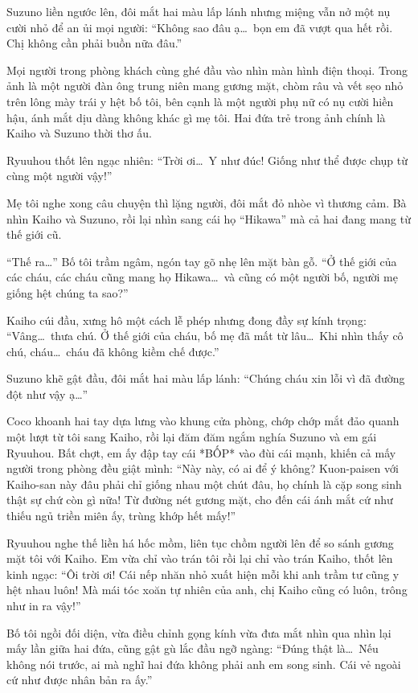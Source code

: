 ﻿\documentclass[../main.tex]{subfiles}
\begin{document}
Suzuno liền ngước lên, đôi mắt hai màu lấp lánh nhưng miệng vẫn nở một nụ cười nhỏ để an ủi mọi người: ``Không sao đâu ạ\dots\ bọn em đã vượt qua hết rồi. Chị không cần phải buồn nữa đâu.''

Mọi người trong phòng khách cùng ghé đầu vào nhìn màn hình điện thoại. Trong ảnh là một người đàn ông trung niên mang gương mặt, chòm râu và vết sẹo nhỏ trên lông mày trái y hệt bố tôi, bên cạnh là một người phụ nữ có nụ cười hiền hậu, ánh mắt dịu dàng không khác gì mẹ tôi. Hai đứa trẻ trong ảnh chính là Kaiho và Suzuno thời thơ ấu.

Ryuuhou thốt lên ngạc nhiên: ``Trời ơi\dots\ Y như đúc! Giống như thể được chụp từ cùng một người vậy!''

Mẹ tôi nghe xong câu chuyện thì lặng người, đôi mắt đỏ nhòe vì thương cảm. Bà nhìn Kaiho và Suzuno, rồi lại nhìn sang cái họ ``Hikawa'' mà cả hai đang mang từ thế giới cũ.

``Thế ra\dots'' Bố tôi trầm ngâm, ngón tay gõ nhẹ lên mặt bàn gỗ. ``Ở thế giới của các cháu, các cháu cũng mang họ Hikawa\dots\ và cũng có một người bố, người mẹ giống hệt chúng ta sao?''

Kaiho cúi đầu, xưng hô một cách lễ phép nhưng đong đầy sự kính trọng: ``Vâng\dots\ thưa chú. Ở thế giới của cháu, bố mẹ đã mất từ lâu\dots\ Khi nhìn thấy cô chú, cháu\dots\ cháu đã không kiềm chế được.''

Suzuno khẽ gật đầu, đôi mắt hai màu lấp lánh: ``Chúng cháu xin lỗi vì đã đường đột như vậy ạ\dots''

Coco khoanh hai tay dựa lưng vào khung cửa phòng, chớp chớp mắt đảo quanh một lượt từ tôi sang Kaiho, rồi lại đăm đăm ngắm nghía Suzuno và em gái Ryuuhou. Bất chợt, em ấy đập tay cái *BỐP* vào đùi cái mạnh, khiến cả mấy người trong phòng đều giật mình: ``Này này, có ai để ý không? Kuon-paisen với Kaiho-san này đâu phải chỉ giống nhau một chút đâu, họ chính là cặp song sinh thật sự chứ còn gì nữa! Từ đường nét gương mặt, cho đến cái ánh mắt cứ như thiếu ngủ triền miên ấy, trùng khớp hết mấy!''

Ryuuhou nghe thế liền há hốc mồm, liên tục chồm người lên để so sánh gương mặt tôi với Kaiho. Em vừa chỉ vào trán tôi rồi lại chỉ vào trán Kaiho, thốt lên kinh ngạc: ``Ôi trời ơi! Cái nếp nhăn nhỏ xuất hiện mỗi khi anh trầm tư cũng y hệt nhau luôn! Mà mái tóc xoăn tự nhiên của anh, chị Kaiho cũng có luôn, trông như in ra vậy!''

Bố tôi ngồi đối diện, vừa điều chỉnh gọng kính vừa đưa mắt nhìn qua nhìn lại mấy lần giữa hai đứa, cũng gật gù lắc đầu ngỡ ngàng: ``Đúng thật là\dots\ Nếu không nói trước, ai mà nghĩ hai đứa không phải anh em song sinh. Cái vẻ ngoài cứ như được nhân bản ra ấy.''
\end{document}
